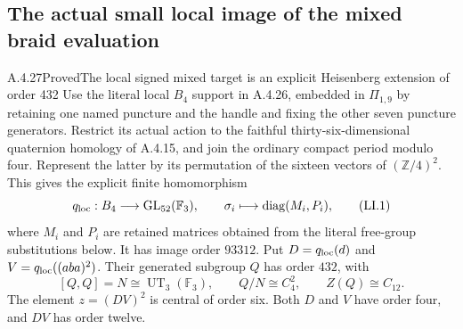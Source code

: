 \subsection{The actual small local image of the mixed braid evaluation}

\begin{result}{A.4.27}{Proved}{The local signed mixed target is an explicit Heisenberg extension of order 432}
Use the literal local $B_4$ support in A.4.26, embedded in
$\Pi_{1,9}$ by retaining one named puncture and the handle and
fixing the other seven puncture generators.  Restrict its actual
action to the faithful thirty-six-dimensional quaternion homology
of A.4.15, and join the ordinary compact period modulo four.
Represent the latter by its permutation of the sixteen vectors
of $(\mathbb Z/4)^2$.  This gives the explicit finite homomorphism
\[
 q_{\rm loc}:B_4\longrightarrow
            \operatorname{GL}_{52}(\mathbb F_3),
 \qquad \sigma_i\longmapsto\operatorname{diag}(M_i,P_i),
                                                               \tag{LI.1}
\]
where $M_i$ and $P_i$ are retained matrices obtained from the
literal free-group substitutions below.  It has image order
$93312$.  Put $D=q_{\rm loc}(d)$ and
$V=q_{\rm loc}((aba)^2)$.  Their generated subgroup $Q$ has
order $432$, with
\[
 [Q,Q]=N\cong\operatorname{UT}_3(\mathbb F_3),\qquad
 Q/N\cong C_4^2,\qquad Z(Q)\cong C_{12}.                \tag{LI.2}
\]
The element $z=(DV)^2$ is central of order six.  Both $D$ and
$V$ have order four, and $DV$ has order twelve.


\end{result}
